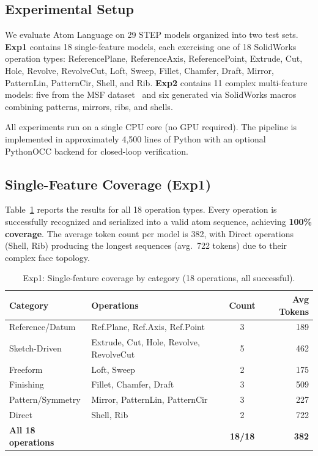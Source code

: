 \documentclass{styles/svproc}
\begin{document}
\subsection{Experimental Setup}

We evaluate Atom Language on 29 STEP models organized into two test sets. \textbf{Exp1} contains 18 single-feature models, each exercising one of 18 SolidWorks operation types: ReferencePlane, ReferenceAxis, ReferencePoint, Extrude, Cut, Hole, Revolve, RevolveCut, Loft, Sweep, Fillet, Chamfer, Draft, Mirror, PatternLin, PatternCir, Shell, and Rib. \textbf{Exp2} contains 11 complex multi-feature models: five from the MSF dataset~\cite{shi2020brep} and six generated via SolidWorks macros combining patterns, mirrors, ribs, and shells.

All experiments run on a single CPU core (no GPU required). The pipeline is implemented in approximately 4,500 lines of Python with an optional PythonOCC backend for closed-loop verification.

\subsection{Single-Feature Coverage (Exp1)}

Table~\ref{tab:exp1} reports the results for all 18 operation types. Every operation is successfully recognized and serialized into a valid atom sequence, achieving \textbf{100\% coverage}. The average token count per model is 382, with Direct operations (Shell, Rib) producing the longest sequences (avg.\ 722 tokens) due to their complex face topology.

\begin{table}[t]
\caption{Exp1: Single-feature coverage by category (18 operations, all successful).}
\label{tab:exp1}
\centering
\begin{tabular}{llcr}
\toprule
Category & Operations & Count & Avg Tokens \\
\midrule
Reference/Datum & Ref.Plane, Ref.Axis, Ref.Point & 3 & 189 \\
Sketch-Driven & Extrude, Cut, Hole, Revolve, RevolveCut & 5 & 462 \\
Freeform & Loft, Sweep & 2 & 175 \\
Finishing & Fillet, Chamfer, Draft & 3 & 509 \\
Pattern/Symmetry & Mirror, PatternLin, PatternCir & 3 & 227 \\
Direct & Shell, Rib & 2 & 722 \\
\midrule
\textbf{All 18 operations} & & \textbf{18/18} & \textbf{382} \\
\bottomrule
\end{tabular}
\end{table}
\end{document}
